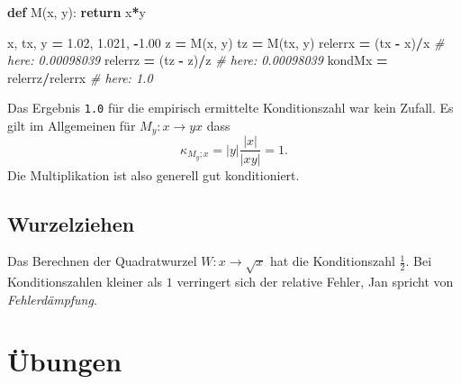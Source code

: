 \documentclass[
]{book}
\newenvironment{Shaded}{\begin{snugshade}}{\end{snugshade}}
\newcommand{\CommentTok}[1]{\textcolor[rgb]{0.56,0.35,0.01}{\textit{#1}}}
\newcommand{\ControlFlowTok}[1]{\textcolor[rgb]{0.13,0.29,0.53}{\textbf{#1}}}
\newcommand{\FloatTok}[1]{\textcolor[rgb]{0.00,0.00,0.81}{#1}}
\newcommand{\KeywordTok}[1]{\textcolor[rgb]{0.13,0.29,0.53}{\textbf{#1}}}
\newcommand{\NormalTok}[1]{#1}
\newcommand{\OperatorTok}[1]{\textcolor[rgb]{0.81,0.36,0.00}{\textbf{#1}}}
\theoremstyle{definition}
\theoremstyle{definition}
\theoremstyle{definition}
\theoremstyle{definition}
\theoremstyle{remark}
\begin{document}
\begin{Shaded}
\begin{Highlighting}[]
\KeywordTok{def}\NormalTok{ M(x, y):}
    \ControlFlowTok{return}\NormalTok{ x}\OperatorTok{*}\NormalTok{y}

\NormalTok{x, tx, y }\OperatorTok{=} \FloatTok{1.02}\NormalTok{, }\FloatTok{1.021}\NormalTok{, }\OperatorTok{{-}}\FloatTok{1.00}
\NormalTok{z }\OperatorTok{=}\NormalTok{ M(x, y)}
\NormalTok{tz }\OperatorTok{=}\NormalTok{ M(tx, y)}
\NormalTok{relerrx }\OperatorTok{=}\NormalTok{ (tx }\OperatorTok{{-}}\NormalTok{ x)}\OperatorTok{/}\NormalTok{x        }\CommentTok{\# here: 0.00098039}
\NormalTok{relerrz }\OperatorTok{=}\NormalTok{ (tz }\OperatorTok{{-}}\NormalTok{ z)}\OperatorTok{/}\NormalTok{z        }\CommentTok{\# here: 0.00098039}
\NormalTok{kondMx }\OperatorTok{=}\NormalTok{ relerrz}\OperatorTok{/}\NormalTok{relerrx    }\CommentTok{\# here: 1.0}
\end{Highlighting}
\end{Shaded}

Das Ergebnis \texttt{1.0} für die empirisch ermittelte Konditionszahl war kein Zufall. Es gilt im Allgemeinen für \(M_y \colon x \to yx\) dass
\begin{equation*}
\kappa_{M_y;x} = |y|\frac{|x|}{|xy|} = 1.
\end{equation*}
Die Multiplikation ist also generell gut konditioniert.

\hypertarget{wurzelziehen}{%
\subsection{Wurzelziehen}\label{wurzelziehen}}

Das Berechnen der Quadratwurzel \(W\colon x \to \sqrt x\) hat die Konditionszahl \(\frac 12\). Bei Konditionszahlen kleiner als \(1\) verringert sich der relative Fehler, Jan spricht von \emph{Fehlerdämpfung}.

\hypertarget{uxfcbungen-1}{%
\section{Übungen}\label{uxfcbungen-1}}
\end{document}
